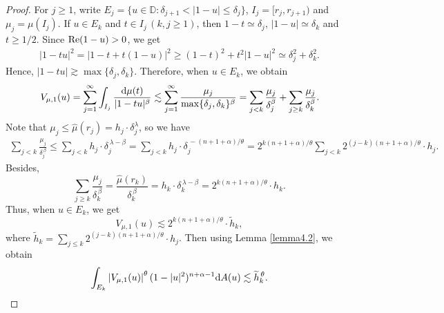 \documentclass[preprint,12pt,times]{elsarticle}
\theoremstyle{definition}
\theoremstyle{remark}
\numberwithin{equation}{section}
\begin{document}
\begin{proof}
For $j\geq 1$, write $E_j=\{u\in\mathbb{D}: \delta_{j+1}<|1-u|\leq \delta_j\}$, $I_j=[r_j,r_{j+1})$ and $\mu_{j}=\mu(I_j)$. If $u\in E_k$ and $t\in I_j\, (k,j\geq 1)$, then $1-t\simeq \delta_j$, $|1-u|\simeq \delta_k$ and $t\geq 1/2$. Since ${\rm Re}(1-u)>0$, we get
\begin{align}\label{equa4.4}
|1-tu|^2=\left|1-t+t(1-u)\right|^2\geq (1-t)^2+t^2|1-u|^2\simeq \delta_j^2+\delta_k^2.
\end{align}
Hence, $|1-tu|\gtrsim \max\{\delta_j,\delta_k\}$. Therefore, when $u\in E_k$, we obtain
\begin{align*}
V_{\mu,1}(u)=\sum_{j=1}^{\infty}\int_{I_j}\frac{{\rm d}\mu(t)}{|1-tu|^{\beta}}\lesssim \sum_{j=1}^{\infty}\frac{\mu_j}{\max\{\delta_j,\delta_k\}^{\beta}}=\sum_{j<k}\frac{\mu_j}{\delta_j^{\beta}}+\sum_{j\geq k}\frac{\mu_j}{\delta_k^{\beta}}.
\end{align*}
Note that $\mu_j\leq \hat{\mu}(r_j)=h_j\cdot \delta_j^{\lambda}$, so we have
\begin{equation*}
\begin{split}
\sum_{j<k}\frac{\mu_j}{\delta_j^{\,\beta}}\leq \sum_{j<k}h_j\cdot \delta_j^{\,\lambda-\beta}=\sum_{j<k}h_j\cdot \delta_j^{\,-(n+1+\alpha)/\theta}=2^{k(n+1+\alpha)/\theta} \sum_{j<k}2^{(j-k)(n+1+\alpha)/\theta}\cdot h_j.
\end{split}
\end{equation*}
Besides,
\begin{equation*}
\sum_{j\geq k}\frac{\mu_j}{\delta_k^{\,\beta}}=\frac{\hat{\mu}(r_k)}{\delta_k^{\,\beta}}=h_k\cdot\delta_k^{\,\lambda-\beta}=2^{k(n+1+\alpha)/\theta}\cdot h_k.
\end{equation*}
Thus, when $u\in E_k$, we get
\begin{equation*}
V_{\mu,1}(u)\lesssim 2^{k(n+1+\alpha)/\theta}\cdot \widetilde{h}_k,
\end{equation*}
where $\widetilde{h}_k=\sum_{j\leq k}2^{(j-k)(n+1+\alpha)/\theta}\cdot h_j$. Then using Lemma \ref{lemma4.2}, we obtain
\begin{align*}
\int_{E_k}\left|V_{\mu,1}(u)\right|^{\theta}(1-|u|^2)^{n+\alpha-1}{\rm d}A(u)\lesssim \widetilde{h}_k^{\,\theta}.
\end{align*}


\end{proof}
\end{document}
